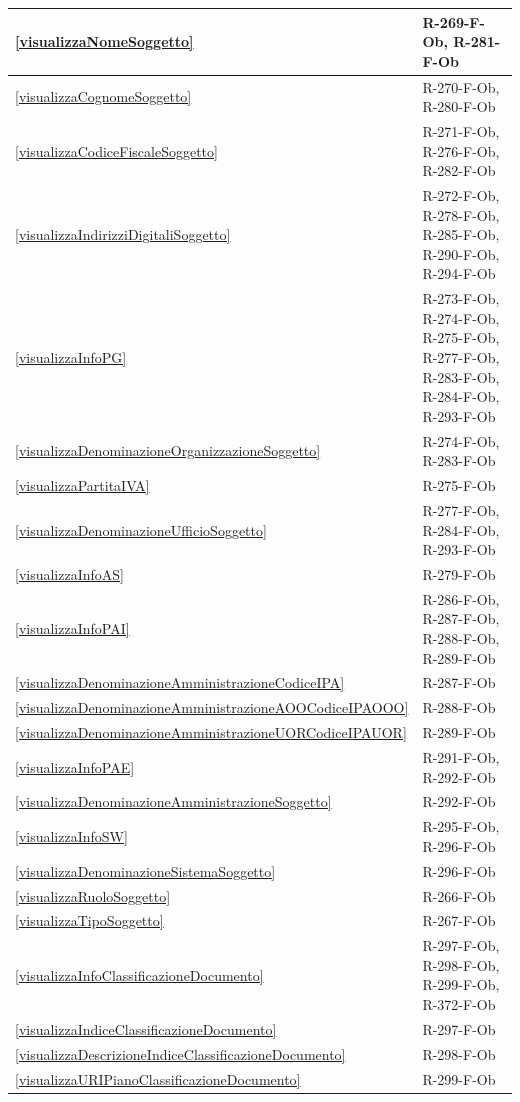 \begin{longtable}{|p{4cm}|p{10cm}|}
\hline
\ref{visualizzaNomeSoggetto} & R-269-F-Ob, R-281-F-Ob \\
\hline
\ref{visualizzaCognomeSoggetto} & R-270-F-Ob, R-280-F-Ob \\
\hline
\ref{visualizzaCodiceFiscaleSoggetto} & R-271-F-Ob, R-276-F-Ob, R-282-F-Ob \\
\hline
\ref{visualizzaIndirizziDigitaliSoggetto} & R-272-F-Ob, R-278-F-Ob, R-285-F-Ob, R-290-F-Ob, R-294-F-Ob \\
\hline
\ref{visualizzaInfoPG} & R-273-F-Ob, R-274-F-Ob, R-275-F-Ob, R-277-F-Ob, R-283-F-Ob, R-284-F-Ob, R-293-F-Ob \\
\hline
\ref{visualizzaDenominazioneOrganizzazioneSoggetto} & R-274-F-Ob, R-283-F-Ob \\
\hline
\ref{visualizzaPartitaIVA} & R-275-F-Ob \\
\hline
\ref{visualizzaDenominazioneUfficioSoggetto} & R-277-F-Ob, R-284-F-Ob, R-293-F-Ob \\
\hline
\ref{visualizzaInfoAS} & R-279-F-Ob \\
\hline
\ref{visualizzaInfoPAI} & R-286-F-Ob, R-287-F-Ob, R-288-F-Ob, R-289-F-Ob \\
\hline
\ref{visualizzaDenominazioneAmministrazioneCodiceIPA} & R-287-F-Ob \\
\hline
\ref{visualizzaDenominazioneAmministrazioneAOOCodiceIPAOOO} & R-288-F-Ob \\
\hline
\ref{visualizzaDenominazioneAmministrazioneUORCodiceIPAUOR} & R-289-F-Ob \\
\hline
\ref{visualizzaInfoPAE} & R-291-F-Ob, R-292-F-Ob \\
\hline
\ref{visualizzaDenominazioneAmministrazioneSoggetto} & R-292-F-Ob \\
\hline
\ref{visualizzaInfoSW} & R-295-F-Ob, R-296-F-Ob \\
\hline
\ref{visualizzaDenominazioneSistemaSoggetto} & R-296-F-Ob \\
\hline
\ref{visualizzaRuoloSoggetto} & R-266-F-Ob \\
\hline
\ref{visualizzaTipoSoggetto} & R-267-F-Ob \\
\hline
\ref{visualizzaInfoClassificazioneDocumento} & R-297-F-Ob, R-298-F-Ob, R-299-F-Ob, R-372-F-Ob \\
\hline
\ref{visualizzaIndiceClassificazioneDocumento} & R-297-F-Ob \\
\hline
\ref{visualizzaDescrizioneIndiceClassificazioneDocumento} & R-298-F-Ob \\
\hline
\ref{visualizzaURIPianoClassificazioneDocumento} & R-299-F-Ob \\

\end{longtable}
